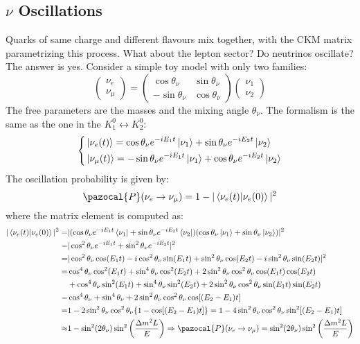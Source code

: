 \documentclass[10.75pt,a4paper,openright,bottom=2cm]{article}
\begin{document}
\subsection{$\nu$ Oscillations}
Quarks of same charge and different flavours mix together, with the CKM matrix parametrizing this process. What about the lepton sector? Do neutrinos oscillate? The answer is yes. Consider a simple toy model with only two families:
\[
\begin{pmatrix}
    \nu_e\\ \nu_\mu
\end{pmatrix}=\begin{pmatrix}
    \cos\theta_\nu & \sin\theta_\nu\\
    -\sin\theta_\nu & \cos\theta_\nu
\end{pmatrix}\begin{pmatrix}
    \nu_1 \\ \nu_2
\end{pmatrix}
\]
The free parameters are the masses and the mixing angle $\theta_\nu$. The formalism is the same as the one in the $K_1^0\leftrightarrow K_2^0$:
\[
\left\{
\begin{aligned}
&\ket{\nu_e(t)}=\cos\theta_\nu e^{-iE_1t}\ket{\nu_1}+\sin\theta_\nu e^{-iE_2t}\ket{\nu_2}\\
&\ket{\nu_\mu(t)}=-\sin\theta_\nu e^{-iE_1t}\ket{\nu_1}+\cos\theta_\nu e^{-iE_2t}\ket{\nu_2}
\end{aligned}
\right.
\]
The oscillation probability is given by:
\[
\pazocal{P}(\nu_e\to\nu_\mu)=1-|\braket{\nu_e(t)|\nu_e(0)}|^2
\]
where the matrix element is computed as:
\begin{align*}
|\braket{\nu_e(t)|\nu_e(0)}|^2=&|(\cos\theta_\nu e^{-iE_1t}\bra{\nu_1}+\sin\theta_\nu e^{-iE_2t}\bra{\nu_2})(\cos\theta_\nu\ket{\nu_1}+\sin\theta_\nu\ket{\nu_2})|^2\\
=&|\cos^2\theta_\nu e^{-iE_1t}+\sin^2\theta_\nu e^{-iE_2t}|^2\\
=&|\cos^2\theta_\nu\cos(E_1t)-i\cos^2\theta_\nu\sin(E_1t)+\sin^2\theta_\nu\cos(E_2t)-i\sin^2\theta_\nu\sin(E_2t)|^2\\
=&\cos^4\theta_\nu\cos^2(E_1t)+\sin^4\theta_\nu\cos^2(E_2t)+2\sin^2\theta_\nu\cos^2\theta_\nu\cos(E_1t)\cos(E_2t)\\
&+\cos^4\theta_\nu\sin^2(E_1t)+\sin^4\theta_\nu\sin^2(E_2t)+2\sin^2\theta_\nu\cos^2\theta_\nu\sin(E_1t)\sin(E_2t)\\
=&\cos^4\theta_\nu+\sin^4\theta_\nu+2\sin^2\theta_\nu\cos^2\theta_\nu\cos[(E_2-E_1)t]\\
=&1-2\sin^2\theta_\nu\cos^2\theta_\nu\{1-\cos[(E_2-E_1)t]\}=1-4\sin^2\theta_\nu\cos^2\theta_\nu\sin^2[(E_2-E_1)t]\\
\approx&1-\sin^2(2\theta_\nu)\sin^2\left(\frac{\Delta m^2L}{E}\right)\Rightarrow\pazocal{P}(\nu_e\to\nu_\mu)=\sin^2(2\theta_\nu)\sin^2\left(\frac{\Delta m^2L}{E}\right)
\end{align*}
\end{document}
